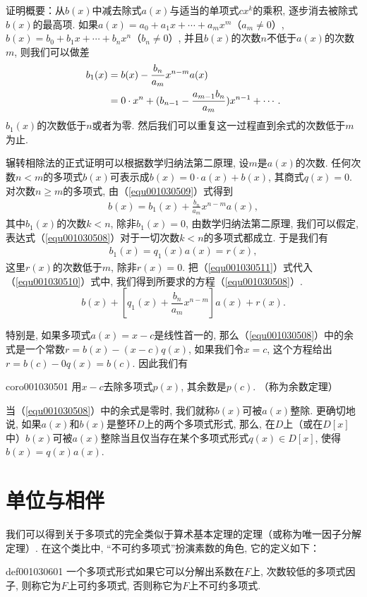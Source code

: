 证明概要：从$b(x)$中减去除式$a(x)$与适当的单项式$cx^k$的乘积, 逐步消去被除式$b(x)$的最高项. 如果$a(x)=a_0+a_1x+\cdots+a_mx^m$（$a_m \neq 0$）, $b(x)=b_0+b_1x+\cdots+b_nx^n$（$b_n \neq 0$）, 并且$b(x)$的次数$n$不低于$a(x)$的次数$m$, 则我们可以做差
\begin{align}
b_1(x) &= b(x) - \frac{b_n}{a_m}x^{n-m}a(x) \notag \\
&= 0 \cdot x^n + (b_{n-1} - \frac{a_{m-1}b_n}{a_m})x^{n-1} + \cdots. \label{equ001030509}
\end{align}
$b_1(x)$的次数低于$n$或者为零. 然后我们可以重复这一过程直到余式的次数低于$m$为止. 

辗转相除法的正式证明可以根据数学归纳法第二原理, 设$m$是$a(x)$的次数. 任何次数$n < m$的多项式$b(x)$可表示成$b(x)=0 \cdot a(x)+b(x)$, 其商式$q(x)=0$. 对次数$n \ge m$的多项式, 由（\ref{equ001030509}）式得到
\begin{gather}\label{equ001030510}
b(x) = b_1(x) + \frac{b_n}{a_m}x^{n-m}a(x),
\end{gather}
其中$b_1(x)$的次数$k < n$, 除非$b_1(x)=0$, 由数学归纳法第二原理, 我们可以假定, 表达式（\ref{equ001030508}）对于一切次数$k<n$的多项式都成立. 于是我们有
\begin{gather}\label{equ001030511}
b_1(x) = q_1(x)a(x) = r(x),
\end{gather}
这里$r(x)$的次数低于$m$, 除非$r(x)=0$. 把（\ref{equ001030511}）式代入（\ref{equ001030510}）式中, 我们得到所要求的方程（\ref{equ001030508}）. 
\[
b(x) + [q_1(x) + \frac{b_n}{a_m}x^{n-m}]a(x) + r(x).
\]

特别是, 如果多项式$a(x)=x-c$是线性首一的, 那么（\ref{equ001030508}）中的余式是一个常数$r = b(x) - (x-c)q(x)$, 如果我们令$x = c$, 这个方程给出$r = b(c) - 0q(x) = b(c)$. 因此我们有
\begin{corollary}{}{coro001030501}
用$x-c$去除多项式$p(x)$, 其余数是$p(c)$. （称为余数定理）
\end{corollary}

当（\ref{equ001030508}）中的余式是零时, 我们就称$b(x)$可被$a(x)$整除. 更确切地说, 如果$a(x)$和$b(x)$是整环$D$上的两个多项式形式, 那么, 在$D$上（或在$D[x]$中）$b(x)$可被$a(x)$整除当且仅当存在某个多项式形式$q(x) \in D[x]$, 使得$b(x)=q(x)a(x)$. 


\section{单位与相伴}\label{subsection0010306}
我们可以得到关于多项式的完全类似于算术基本定理的定理（或称为唯一因子分解定理）. 在这个类比中, “不可约多项式”扮演素数的角色, 它的定义如下：
\begin{definition}{}{def001030601}
一个多项式形式如果它可以分解出系数在$F$上, 次数较低的多项式因子, 则称它为$F$上可约多项式, 否则称它为$F$上不可约多项式. 
\end{definition}

